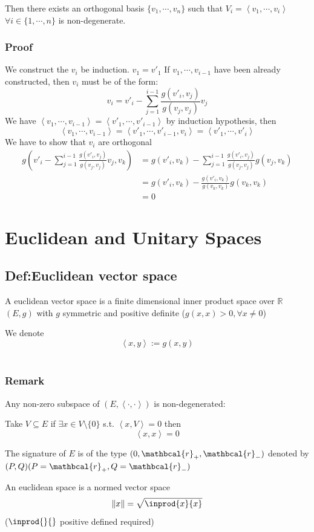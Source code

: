 \documentclass{book}
\begin{document}
Then there exists an orthogonal basis $\{v_1,\cdots,v_n\}$ such that $V_i=\left<v_1,\cdots,v_i\right>$ $\forall i\in \{1,\cdots,n\}$ is non-degenerate.

\subsection*{Proof}
We construct the $v_i$ be induction. $v_1=v'_1$ If $v_1,\cdots,v_{i-1}$  have been already constructed, then $v_i$ must be of the form:$$v_i=v'_i-\sum\limits_{j=1}^{i-1}\frac{g(v'_i,v_j)}{g(v_j,v_j)}v_j$$
We have $\left< v_1,\cdots,v_{i-1}\right>=\left<v'_1,\cdots,v'_{i-1}\right>$ by induction hypothesis, then
$$\left<v_1,\cdots, v_{i-1}\right>=\left<v'_1,\cdots,v'_{i-1},v_i\right>=\left<v'_1,\cdots,v'_i\right>$$
We have to show that $v_i$ are orthogonal
$$\begin{aligned}
    g\left(v'_i-\sum\limits_{j=1}^{i-1}\frac{g(v'_i,v_j)}{g(v_j,v_j)}v_j,v_k\right) &= g(v'_i,v_k)-\sum\limits_{j=1}^{i-1}\frac{g(v'_i,v_j)}{g(v_j,v_j)}g(v_j,v_k)\\
    &=g(v'_i,v_k)-\frac{g(v'_i,v_k)}{g(v_k,v_k)}g(v_k,v_k)\\
    &=0
\end{aligned}$$
\chapter{Euclidean and Unitary Spaces}
\section{Def:Euclidean vector space}
A euclidean vector space is a finite dimensional inner product space over $\mathbb{R}$ $(E,g)$ with $g$ symmetric and positive definite ($g(x,x)>0,\forall x\neq 0$)

We denote$$\left<x,y\right>:=g(x,y)$$\
\subsection*{Remark}
Any non-zero subspace of $(E,\left<\cdot,\cdot\right>)$ is non-degenerated:

Take $V\subseteq E$ if $\exists x\in V\setminus\{0\}$ s.t. $\left<x,V\right>=0$ then $$\left<x,x\right>=0$$

The signature of $E$ is of the type $(0,\mathbcal{r}_+,\mathbcal{r}_-)$ denoted by $(P,Q)(P=\mathbcal{r}_+,Q=\mathbcal{r}_-)$

An euclidean space is a normed vector space $$\norm{x}=\sqrt{\inprod{x}{x}}$$
($\inprod{}{}$ positive defined required)
\end{document}
